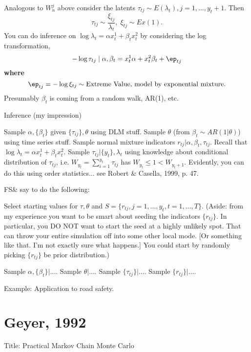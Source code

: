 \documentclass{article}
\begin{document}
\begin{outline}
  Analogous to $W_n^j$ above consider the latents $\tau_{tj} \sim E(\lambda_t),
  j = 1, \ldots, y_t + 1$.  Then
  \[
  \tau_{tj} \sim \frac{\xi_{tj}}{\lambda_t}, \; \xi_{tj} \sim Ex(1).
  \]
  You can do inference on $\log \lambda_t = \alpha x^1_t + \beta_t x^2_t$ by
  considering the log transformation,
  \[
  - \log \tau_{tj} \mid \alpha, \beta_t = x_t^1 \alpha + x_t^2 \beta_t + \ep_{tj}
  \]
  \textbf{ where }
  \[
  \ep_{tj} = - \log \xi_{tj} \sim \textmd{Extreme Value, model by exponential mixture.}
  \]
  Presumably $\beta_t$ is coming from a random walk, AR(1), etc.

  \2 Inference (my impression)

    \3 Sample $\alpha, \{\beta_t\}$ given $\{\tau_{ij}\}, \theta$ using DLM stuff.
    \3 Sample $\theta$ (from $\beta_t \sim AR(1|\theta)$) using time series stuff.
    \3 Sample normal mixture indicators $r_{tj} | \alpha, \beta_t, \tau_{tj}$.
    \3 Recall that $\log \lambda_t = \alpha x^1_t + \beta_t x_t^2$.
    \3 Sample $\tau_{tj} | \{y_{t}\}, \lambda_t$ using knowledge about
    conditional distribution of $\tau_{tj}$, i.e. $W_{y_t} = \sum_{i=1}^{y_t}
    \tau_{tj}$ has $W_{y_t} \leq 1 < W_{y_t+1}$.  Evidently, you can do this
    using order statistics... see Robert \& Casella, 1999, p. 47.


  \2 FS\& say to do the following:

  Select starting values for $\tau, \theta$ and $S = \{r_{tj}, j=1, \ldots, y_t,
  t=1, \ldots, T\}$.  (Aside: from my experience you want to be smart about
  seeding the indicators $\{r_{tj}\}$.  In particular, you DO NOT want to start
  the seed at a highly unlikely spot.  That can throw your entire simulation off
  into some other local mode.  [Or something like that.  I'm not exactly sure
  what happens.]  You could start by randomly picking $\{r_{tj}\}$ be prior
  distribution.)

    \3 Sample $\alpha, \{\beta_t\} | \ldots$.
    \3 Sample $\theta | \ldots$.
    \3 Sample $\{\tau_{tj}\} | \ldots$.
    \3 Sample $\{r_{tj}\} | \ldots$.
  
\1 Example: Application to road safety.

\end{outline}

\section{Geyer, 1992}

Title: Practical Markov Chain Monte Carlo
\end{document}
